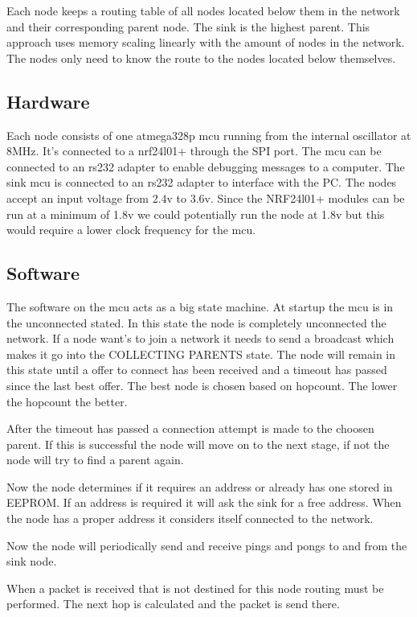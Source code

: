 \documentclass[a4paper,11pt]{article}
\begin{document}
Each node keeps a routing table of all nodes located below them in the
network and their corresponding parent node. The sink is the highest
parent. This approach uses memory scaling linearly with the amount of
nodes in the network. The nodes only need to know the route to the
nodes located below themselves.

\subsection{Hardware}
Each node consists of one atmega328p mcu running from the
internal oscillator at 8MHz. It's connected to a nrf24l01+ through the
SPI port. The mcu can be connected to an rs232 adapter to enable
debugging messages to a computer. The sink mcu is connected to an
rs232 adapter to interface with the PC. The nodes accept an input
voltage from 2.4v to 3.6v. Since the NRF24l01+ modules can be run at a
minimum of 1.8v we could potentially run the node at 1.8v but this
would require a lower clock frequency for the mcu.



\subsection{Software}
The software on the mcu acts as a big state machine. At startup the
mcu is in the unconnected stated. In this state the node is completely
unconnected the network. If a node want's to join a network it needs
to send a broadcast which makes it go into the COLLECTING PARENTS
state. The node will remain in this state until a offer to connect has
been received and a timeout has passed since the last best offer. The
best node is chosen based on hopcount. The lower the hopcount the
better.

After the timeout has passed a connection attempt is made to the
choosen parent. If this is successful the node will move on to the
next stage, if not the node will try to find a parent again.

Now the node determines if it requires an address or already has one
stored in EEPROM. If an address is required it will ask the sink for a
free address. When the node has a proper address it considers itself
connected to the network.

Now the node will periodically send and receive pings and pongs to and
from the sink node.

When a packet is received that is not destined for this node routing
must be performed. The next hop is calculated and the packet is send
there.
\end{document}
